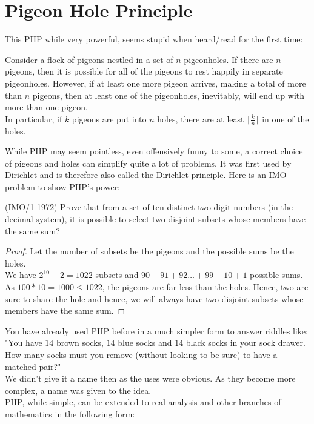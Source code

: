 \section{Pigeon Hole Principle}
This PHP while very powerful, seems stupid when heard/read for the first time:
\begin{theorem}
    Consider a flock of pigeons nestled in a set of $n$ pigeonholes. If there are $n$ pigeons, then it is possible for all of the pigeons to rest happily in separate pigeonholes. However, if at least one more pigeon arrives, making a total of more than $n$ pigeons, then at least one of the pigeonholes, inevitably, will end up with more than one pigeon.\\
    In particular, if $k$ pigeons are put into $n$ holes, there are at least $\lceil \frac{k}{n} \rceil$ in one of the holes.
\end{theorem}
While PHP may seem pointless, even offensively funny to some, a correct choice of pigeons and holes can simplify quite a lot of problems. It was first used by Dirichlet and is therefore also called the Dirichlet principle. Here is an IMO problem to show PHP's power:\\
\begin{example}
    (IMO/1 1972) Prove that from a set of ten distinct two-digit numbers (in the decimal system), it is possible to select two disjoint subsets whose members have the same sum?
\end{example}
\begin{proof}
    Let the number of subsets be the pigeons and the possible sums be the holes. \\
    We have $2^{10} -2 =1022$ subsets and $90+91+92 \dots +99 - 10 + 1$ possible sums. As $100*10=1000 \leq 1022$, the pigeons are far less than the holes. Hence, two are sure to share the hole and hence, we will always have two disjoint subsets whose members have the same sum.
\end{proof}
You have already used PHP before in a much simpler form to answer riddles like: "You have $14$ brown socks, $14$ blue socks and $14$ black socks in your sock drawer. How many socks must you remove (without looking to be sure) to have a matched pair?"\\
We didn't give it a name then as the uses were obvious. As they become more complex, a name was given to the idea.\\
PHP, while simple,  can be extended to real analysis and other branches of mathematics in the following form:\\
